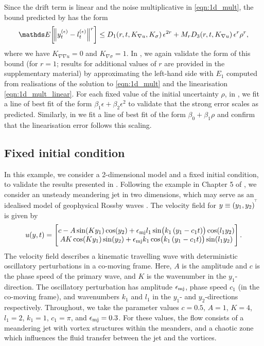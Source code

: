 Since the drift term is linear and the noise multiplicative in \cref{eqn:1d_mult}, the bound predicted by  has the form
\[
	\avg{\norm{y_t^{(\epsilon)} - l_t^{(\epsilon)}}^r} \leq D_1\!\left(r,t, K_{\nabla u}, K_\sigma\right)\epsilon^{2r} + M_{r}D_3\!\left(r,t, K_{\nabla u}\right)\epsilon^r\rho^{r},
\]
where we have \(K_{\nabla\nabla u} = 0\) and \(K_{\nabla\sigma} = 1\).
In , we again validate the form of this bound (for \(r = 1\); results for additional values of \(r\) are provided in the supplementary material) by approximating the left-hand side with \(E_1\) computed from realisations of the solution to \cref{eqn:1d_mult} and the linearisation \cref{eqn:1d_mult_linear}.
For each fixed value of the initial uncertainty \(\rho\), in , we fit a line of best fit of the form \(\beta_1 \epsilon + \beta_2 \epsilon^2\) to validate that the strong error scales as predicted.
Similarly, in  we fit a line of best fit of the form \(\beta_0 + \beta_1 \rho\) and confirm that the linearisation error follows this scaling.


\subsection{Fixed initial condition}\label{sec:numerics_2d}
In this example, we consider a 2-dimensional model and a fixed initial condition, to validate the results presented in .
Following the example in Chapter 5 of \citet{SamelsonWiggins_2006_LagrangianTransportGeophysical}, we consider an unsteady meandering jet in two dimensions, which may serve as an idealised model of geophysical Rossby waves \citep{Pierrehumbert_1991_ChaoticMixingTracer}.
The velocity field for \(y \equiv \left(y_1, y_2\right)^{^{\!\top}}\) is given by
\begin{equation}
	u\!\left(y, t\right) = \begin{bmatrix}
		c - A\sin\!\left(Ky_1\right)\cos\!\left(y_2\right) + \oldepsilon_{\mathrm{mj}} l_1\sin\!\left(k_1\left(y_1 - c_1 t\right)\right)\cos\!\left(l_1 y_2\right) \\
		AK\cos\!\left(Ky_1\right)\sin\!\left(y_2\right) + \oldepsilon_{\mathrm{mj}} k_1\cos\!\left(k_1\left(y_1 - c_1t\right)\right)\sin\!\left(l_1 y_2\right)
	\end{bmatrix}.
	\label{eqn:jet_ex}
\end{equation}
The velocity field describes a kinematic travelling wave with deterministic oscillatory perturbations in a co-moving frame.
Here, \(A\) is the amplitude and \(c\) is the phase speed of the primary wave, and \(K\) is the wavenumber in the \(y_1\)-direction.
The oscillatory perturbation has amplitude \(\epsilon_{\mathrm{mj}}\), phase speed \(c_1\) (in the co-moving frame), and wavenumbers \(k_1\) and \(l_1\) in the \(y_1\)- and \(y_2\)-directions respectively.
Throughout, we take the parameter values \(c = 0.5\), \(A = 1\), \(K = 4\), \(l_1 = 2\), \(k_1 = 1\), \(c_1 = \pi\), and \(\epsilon_{\mathrm{mj}} = 0.3\).
For these values, the flow consists of a meandering jet with vortex structures within the meanders, and a chaotic zone which influences the fluid transfer between the jet and the vortices.

